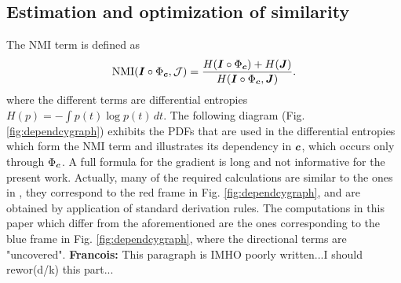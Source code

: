 \documentclass[twocolumn]{svjour3}
\newcommand{\francois}[1]{{\color{red}\textbf{Francois: }#1}}
\newcommand{\francois}[1]{{}}
\begin{document}
\subsection{Estimation and optimization of similarity} 
The NMI term is defined as
\begin{equation}
	\text{NMI}(\boldsymbol{I}\circ\Phi_{\boldsymbol{c}}, {\mathcal J}) = \frac{H(\boldsymbol{I}\circ\Phi_{\boldsymbol{c}}) + H(\boldsymbol{J}) }{H(\boldsymbol{I}\circ\Phi_{\boldsymbol{c}}, \boldsymbol{J})}.
\end{equation} where the different terms are differential entropies $H(p) = -\int p(t)\log p(t)\,dt$.
The following diagram (Fig. \ref{fig:dependcygraph}) exhibits the PDFs that are used in the differential 
entropies which form the NMI term and illustrates its dependency in $\boldsymbol{c}$, which occurs only through 
$\Phi_{\boldsymbol{c}}$. A full formula for the gradient is long and not informative for the present work. Actually, 
many of the required calculations are similar to the ones in  \cite{rueckert1999nonrigid,darknersporring2012pami,jensen2015locally}, 
they correspond to the red frame in Fig. \ref{fig:dependcygraph}, and are obtained by application of standard derivation rules.  
 The computations in this paper which differ from the aforementioned are the ones 
corresponding to the blue frame in Fig. \ref{fig:dependcygraph}, where the directional terms are "uncovered". 
\francois{This paragraph is IMHO poorly written...I should rewor(d/k) this part...}
\end{document}
